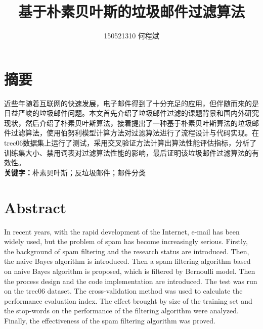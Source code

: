 \documentclass[UTF8,zihao=-4]{ctexart}
\title{基于朴素贝叶斯的垃圾邮件过滤算法}
\author{150521310 何程斌}
\date{}
\begin{document}


\section*{摘要}

  \linespread{1.25}\songti{}
   近些年随着互联网的快速发展，电子邮件得到了十分充足的应用，但伴随而来的是日益严峻的垃圾邮件问题。本文首先介绍了垃圾邮件过滤的课题背景和国内外研究现状，然后介绍了朴素贝叶斯算法，接着提出了一种基于朴素贝叶斯算法的垃圾邮件过滤算法，使用伯努利模型计算方法对过滤算法进行了流程设计与代码实现。在trec06数据集上运行了测试，采用交叉验证方法计算出算法性能评估指标，分析了训练集大小、禁用词表对过滤算法性能的影响，最后证明该垃圾邮件过滤算法的有效性。
   \\
   

  {\noindent\heiti{}\textbf{关键字：}朴素贝叶斯；反垃圾邮件；邮件分类}
\newpage

\section*{Abstract}

  \linespread{1.25}
	In recent years, with the rapid development of the Internet, e-mail has been widely used, but the problem of spam has become increasingly serious. Firstly, the background of spam filtering and the research status are introduced. Then, the naive Bayes algorithm is introduced. Then a spam filtering algorithm based on naive Bayes algorithm is proposed, which is filtered by Bernoulli model. Then the process design and the code implementation are introduced. The test was run on the trec06 dataset. The cross-validation method was used to calculate the performance evaluation index. The effect brought by size of the training set and the stop-words on the performance of the filtering algorithm were analyzed. Finally, the effectiveness of the spam filtering algorithm was proved.
	\\
\end{document}
